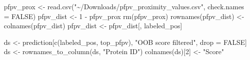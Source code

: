 \documentclass[
  11pt,
  oneside]{book}
\newenvironment{Shaded}{\begin{snugshade}}{\end{snugshade}}
\newcommand{\AttributeTok}[1]{\textcolor[rgb]{0.77,0.63,0.00}{#1}}
\newcommand{\ConstantTok}[1]{\textcolor[rgb]{0.00,0.00,0.00}{#1}}
\newcommand{\DecValTok}[1]{\textcolor[rgb]{0.00,0.00,0.81}{#1}}
\newcommand{\FunctionTok}[1]{\textcolor[rgb]{0.00,0.00,0.00}{#1}}
\newcommand{\NormalTok}[1]{#1}
\newcommand{\OtherTok}[1]{\textcolor[rgb]{0.56,0.35,0.01}{#1}}
\newcommand{\SpecialCharTok}[1]{\textcolor[rgb]{0.00,0.00,0.00}{#1}}
\newcommand{\StringTok}[1]{\textcolor[rgb]{0.31,0.60,0.02}{#1}}
\begin{document}
\begin{Shaded}
\begin{Highlighting}[]
\NormalTok{pfpv\_prox }\OtherTok{\textless{}{-}} \FunctionTok{read.csv}\NormalTok{(}\StringTok{"\textasciitilde{}/Downloads/pfpv\_proximity\_values.csv"}\NormalTok{, }\AttributeTok{check.names =} \ConstantTok{FALSE}\NormalTok{)}
\NormalTok{pfpv\_dist }\OtherTok{\textless{}{-}} \DecValTok{1} \SpecialCharTok{{-}}\NormalTok{ pfpv\_prox}
\FunctionTok{rm}\NormalTok{(pfpv\_prox)}
\FunctionTok{rownames}\NormalTok{(pfpv\_dist) }\OtherTok{\textless{}{-}} \FunctionTok{colnames}\NormalTok{(pfpv\_dist)}
\NormalTok{pfpv\_dist }\OtherTok{\textless{}{-}}\NormalTok{ pfpv\_dist[, labeled\_pos]}
\end{Highlighting}
\end{Shaded}

\begin{Shaded}
\begin{Highlighting}[]
\NormalTok{ds }\OtherTok{\textless{}{-}}\NormalTok{ prediction[}\FunctionTok{c}\NormalTok{(labeled\_pos, top\_pfpv), }\StringTok{"OOB score filtered"}\NormalTok{, drop }\OtherTok{=} \ConstantTok{FALSE}\NormalTok{]}
\NormalTok{ds }\OtherTok{\textless{}{-}} \FunctionTok{rownames\_to\_column}\NormalTok{(ds, }\StringTok{"Protein ID"}\NormalTok{)}
\FunctionTok{colnames}\NormalTok{(ds)[}\DecValTok{2}\NormalTok{] }\OtherTok{\textless{}{-}} \StringTok{"Score"}


\end{Highlighting}
\end{Shaded}
\end{document}
